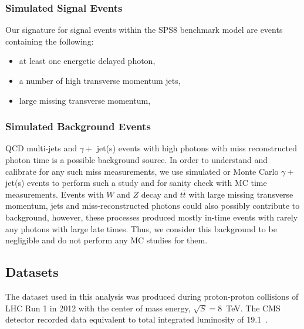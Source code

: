 \subsubsection*{Simulated Signal Events}
Our signature for signal events within the SPS8 benchmark model are events containing the following:

\begin{itemize}
\item at least one energetic delayed photon,
\item a number of high transverse momentum jets,
\item large missing transverse momentum,
\end{itemize}
\subsubsection*{Simulated Background Events}
QCD multi-jets and $\gamma +$ jet(s) events with high \pt photons with miss reconstructed photon time is a possible background source. In order to understand and calibrate  for any such miss measurements, we use simulated or Monte Carlo $\gamma +$ jet(s) events to perform such a study and for sanity check with MC time measurements. Events with $W$ and $Z$ decay  and $t\bar{t}$ with large missing transverse momentum, jets and miss-reconstructed photons could also possibly contribute to background, however, these processes produced mostly in-time events with rarely any photons with large late times. Thus, we consider this background to be negligible and do not perform any MC studies for them. 
\subsection{Datasets}
The dataset used in this analysis was produced during proton-proton collisions of LHC Run 1 in 2012 with the center of mass energy, $\sqrt{S} = 8$~TeV. The CMS detector recorded data equivalent to total integrated luminosity of 19.1~\fbinv .
